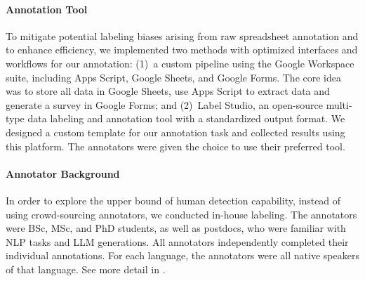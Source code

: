 \paragraph{Annotation Tool}
To mitigate potential labeling biases arising from raw spreadsheet annotation and to enhance efficiency, we implemented two methods with optimized interfaces and workflows for our annotation: (1)~a custom pipeline using the Google Workspace suite, including Apps Script, Google Sheets, and Google Forms. The core idea was to store all data in Google Sheets, use Apps Script to extract data and generate a survey in Google Forms; and (2)~Label Studio, an open-source multi-type data labeling and annotation tool with a standardized output format. We designed a custom template for our annotation task and collected results using this platform. The annotators were given the choice to use their preferred tool. 



\paragraph{Annotator Background}
In order to explore the upper bound of human detection capability, instead of using crowd-sourcing annotators, we conducted in-house labeling. 
The annotators were BSc, MSc, and PhD students, as well as postdocs, who were familiar with NLP tasks and LLM generations. All annotators independently completed their individual annotations. For each language, the annotators were all native speakers of that language. See more detail in .

